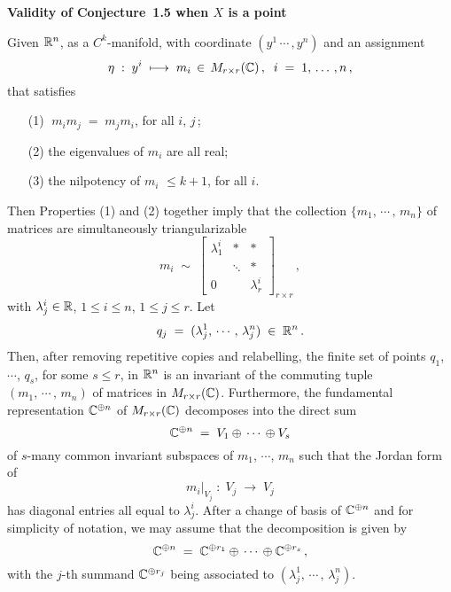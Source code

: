 \documentclass[11pt]{article}
\numberwithin{equation}{subsection}
\begin{document}
\begin{flushleft}
{\bf Validity of Conjecture~1.5 when $X$ is a point}  %
\end{flushleft}
%
Given ${\Bbb R}^n$, as a $C^k$-manifold, with coordinate $(y^1\,\cdots\,, y^n)$
 and an assignment
  $$
    \eta\;:\; y^i\; \longmapsto\; m_i\,\in\,  M_{r\times r}({\Bbb C})\,,\;\;
	i\;=\;1,\,\ldots\,,n\,,
  $$
 that satisfies
  \begin{itemize}
   \item[(1)]
     $\;m_im_j\;=\;m_jm_i$, for all $i,\,j\,$;

   \item[(2)]
	 the eigenvalues of $m_i$ are all real;
	
   \item[(3)]
	 the nilpotency of $m_i$ $\le k+1$, for all $i$.
  \end{itemize}	
Then
  Properties (1) and (2) together imply that
  the collection $\{m_1,\,\cdots\,,\, m_n\}$ of matrices are simultaneously triangularizable
   $$
     m_i\;\sim\;
	  \left[
        \begin{array}{ccc}
		     \lambda^i_1  & \ast  & \ast \\
			    & \ddots  & \ast    \\
		0	 && \lambda^i_r
		\end{array}
	  \right]_{r\times r}\,,	
  $$
  with $\lambda^i_j\in {\Bbb R}$, $1\le i \le n$, $1\le j\le r$.
 Let
  $$
    q_j\; =\; (\lambda_j^1,\,\cdots\,,\,\lambda_j^n)\; \in \; {\Bbb R}^n\,.
  $$
 Then, after removing repetitive copies and relabelling,
  the finite set of points $q_1$, $\cdots$, $q_s$, for some $s\le r$, in ${\Bbb R}^n$
   is an invariant of  the commuting tuple $(m_1, \,\cdots\,,\, m_n)$
   of matrices in $M_{r\times r}({\Bbb C})$.
 Furthermore,
  the fundamental representation ${\Bbb C}^{\oplus n}$ of $M_{r\times r}({\Bbb C})$
  decomposes into the direct sum
  $$
   {\Bbb C}^{\oplus n}\;=\; V_1\oplus\, \cdots\, \oplus V_s
  $$
  of $s$-many common invariant subspaces of $m_1$, $\cdots$, $m_n$
  such that
  the Jordan form of
  $$
     m_i|_{V_j}\; :\;  V_j\; \longrightarrow\;  V_j
  $$
   has diagonal entries all equal to $\lambda^i_j$.
 After a change of basis of ${\Bbb C}^{\oplus n}$ and for  simplicity of notation,
  we may assume that the decomposition is given by
  $$
    {\Bbb C}^{\oplus n}\;
	 =\; {\Bbb C}^{\oplus r_1}\oplus\, \cdots\, \oplus {\Bbb C}^{\oplus r_s}\,,
  $$
  with the $j$-th summand ${\Bbb C}^{\oplus r_j }$
   being associated to $(\lambda^1_j, \,\cdots\,,\,\lambda^n_j)$.
\end{document}
